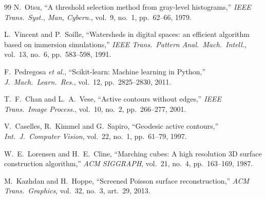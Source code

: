 \documentclass[conference]{IEEEtran}
\begin{document}
\begin{thebibliography}{99}
N.~Otsu,
``A threshold selection method from gray-level histograms,''
\emph{IEEE Trans.\ Syst., Man, Cybern.}, vol.~9, no.~1,
pp.~62--66, 1979.

L.~Vincent and P.~Soille,
``Watersheds in digital spaces: an efficient algorithm based on
immersion simulations,''
\emph{IEEE Trans.\ Pattern Anal.\ Mach.\ Intell.}, vol.~13,
no.~6, pp.~583--598, 1991.

F.~Pedregosa \emph{et al.},
``Scikit-learn: Machine learning in Python,''
\emph{J.\ Mach.\ Learn.\ Res.}, vol.~12, pp.~2825--2830, 2011.

T.~F.~Chan and L.~A.~Vese,
``Active contours without edges,''
\emph{IEEE Trans.\ Image Process.}, vol.~10, no.~2,
pp.~266--277, 2001.

V.~Caselles, R.~Kimmel and G.~Sapiro,
``Geodesic active contours,''
\emph{Int.\ J.\ Computer Vision}, vol.~22, no.~1,
pp.~61--79, 1997.

W.~E.~Lorensen and H.~E.~Cline,
``Marching cubes: A high resolution 3D surface construction
algorithm,''
\emph{ACM SIGGRAPH}, vol.~21, no.~4, pp.~163--169, 1987.

M.~Kazhdan and H.~Hoppe,
``Screened Poisson surface reconstruction,''
\emph{ACM Trans.\ Graphics}, vol.~32, no.~3, art.~29, 2013.

\end{thebibliography}
\end{document}
